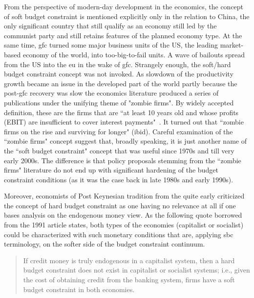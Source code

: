 From the perspective of modern-day development in the economics, the concept of soft budget constraint is mentioned explicitly only in the relation to China, the only significant country that still qualify as an economy still led by the communist party and still retains features of the planned economy type. At the same time, \ac{gfc} turned some major business units of the US, the leading market-based economy of the world, into too-big-to-fail units. A wave of bailouts spread from the US into the \ac{eu} in the wake of \ac{gfc}. Strangely enough, the soft/hard budget constraint concept was not invoked. As slowdown of the productivity growth became an issue in the developed part of the world partly because the post-\ac{gfc} recovery was slow the economics literature produced a series of publications under the unifying theme of "zombie firms". By widely accepted definition, these are the firms that are ``at least 10 years old and whose profits (EBIT) are insufficient to cover interest payments"~\citep[p.~6]{borio2018}. It turned out that ``zombie firms on the rise and surviving for longer" (ibid). Careful examination of the ``zombie firms" concept suggest that, broadly speaking, it is just another name of the ``soft budget constraint" concept that was useful since 1970s and till very early 2000s. The difference is that policy proposals stemming from the ``zombie firms" literature do not end up with significant hardening of the budget constraint conditions (as it was the case back in late 1980s and early 1990s).

Moreover, economists of Post Keynesian tradition from the quite early criticized the concept of hard budget constraint as one having no relevance at all if one bases analysis on the endogenous money view. As the following quote borrowed from the 1991 article states, both types of the economies (capitalist or socialist) could be characterized with such monetary conditions that are, applying \ac{sbc} terminology, on the softer side of the budget constraint continuum. 

\begin{quote}
If credit money is truly endogenous in a capitalist system, then a hard budget constraint does not exist in capitalist or socialist systems; i.e., given the cost of obtaining credit from the banking system, firms have a soft budget constraint in both economies.~\citep[p.~330, emphasis added]{szego1991}
\end{quote}

